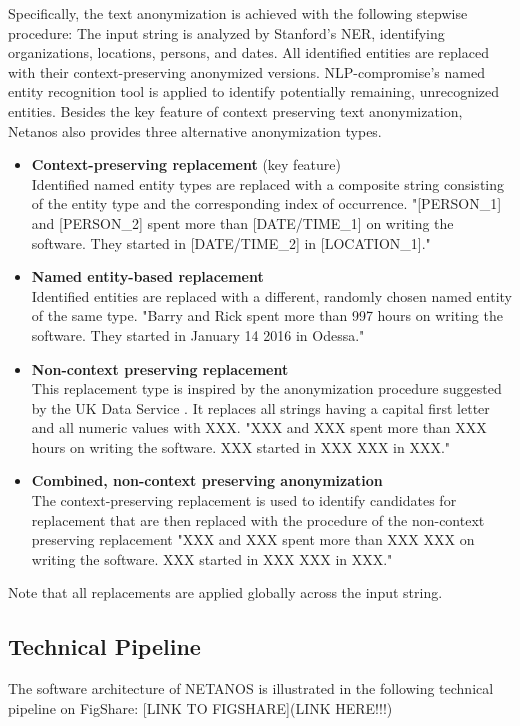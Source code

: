 \documentclass{article}
\begin{document}
\noindent Specifically, the text anonymization is achieved with the following stepwise procedure: The input string is analyzed by Stanford's NER, identifying organizations, locations, persons, and dates. All identified entities are replaced with their context-preserving anonymized versions. NLP-compromise's named entity recognition tool is applied to identify potentially remaining, unrecognized entities.
\vskip 0.5cm
\noindent Besides the key feature of context preserving text anonymization, Netanos also provides three alternative anonymization types. 
\begin{itemize}
\item \textbf{Context-preserving replacement} (key feature) \\
Identified named entity types are replaced with a composite string consisting of the entity type and the corresponding index of occurrence. "[PERSON\_1] and [PERSON\_2] spent more than [DATE/TIME\_1] on writing the software. They started in [DATE/TIME\_2] in [LOCATION\_1]."
\item \textbf{Named entity-based replacement} \\
Identified entities are replaced with a different, randomly chosen named entity of the same type. "Barry and Rick spent more than 997 hours on writing the software. They started in January 14 2016 in Odessa."
\item \textbf{Non-context preserving replacement} \\
This replacement type is inspired by the anonymization procedure suggested by the UK Data Service \cite{ukda}. It replaces all strings having a capital first letter and all numeric values with XXX. "XXX and XXX spent more than XXX hours on writing the software. XXX started in XXX XXX in XXX."
\item \textbf{Combined, non-context preserving anonymization} \\
The context-preserving replacement is used to identify candidates for replacement that are then replaced with the procedure of the non-context preserving replacement "XXX and XXX spent more than XXX XXX on writing the software. XXX started in XXX XXX in XXX." 
\end{itemize}
Note that all replacements are applied globally across the input string.

\subsection*{Technical Pipeline}
The software architecture of NETANOS is illustrated in the following technical pipeline on FigShare: [LINK TO FIGSHARE](LINK HERE!!!)
\end{document}
